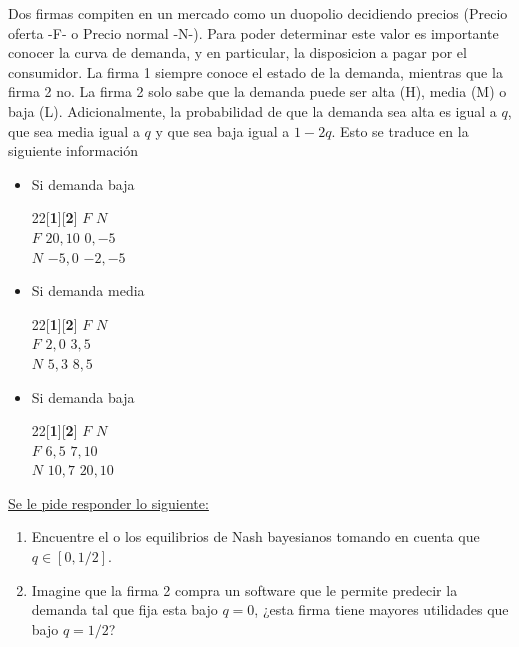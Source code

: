\documentclass[11pt]{article}
\begin{document}
Dos firmas compiten en un mercado como un duopolio decidiendo precios (Precio oferta -F- o Precio normal -N-). Para poder determinar este valor es importante conocer la curva de demanda, y en particular, la disposicion a pagar por el consumidor. La firma 1 siempre conoce el estado de la demanda, mientras que la firma 2 no. La firma 2 solo sabe que la demanda puede ser alta (H), media (M) o baja (L). Adicionalmente, la probabilidad de que la demanda sea alta es igual a $q$, que sea media igual a $q$ y que sea baja igual a $1-2q$. Esto se traduce en la siguiente informaci\'on
\begin{itemize}
	\item Si demanda baja
			\begin{center}
 				\begin{game}{2}{2}[\textbf{1}][\textbf{2}]
                  				\>$F$         \>$N$\\
        			$F$       \>$20,10$       \>$0,-5$\\
        			$N$       \>$-5,0$       \>$-2,-5$
				\end{game} 
			\end{center}	
	\item Si demanda media
			\begin{center}
 				\begin{game}{2}{2}[\textbf{1}][\textbf{2}]
                  				\>$F$         \>$N$\\
        			$F$       \>$2,0$       \>$3,5$\\
        			$N$       \>$5,3$       \>$8,5$
				\end{game} 
			\end{center} 
	\item Si demanda baja
			\begin{center}
 				\begin{game}{2}{2}[\textbf{1}][\textbf{2}]
                  				\>$F$         \>$N$\\
        			$F$       \>$6,5$       \>$7,10$\\
        			$N$       \>$10,7$       \>$20,10$
				\end{game} 
			\end{center} 
\end{itemize}

\underline{Se le pide responder lo siguiente:}
\begin{enumerate}
	\item Encuentre el o los equilibrios de Nash bayesianos tomando en cuenta que $q \in [0,1/2]$.
	\item Imagine que la firma 2 compra un software que le permite predecir la demanda tal que fija esta bajo $q=0$, ¿esta firma tiene mayores utilidades que bajo $q=1/2$?
\end{enumerate}
\end{document}
